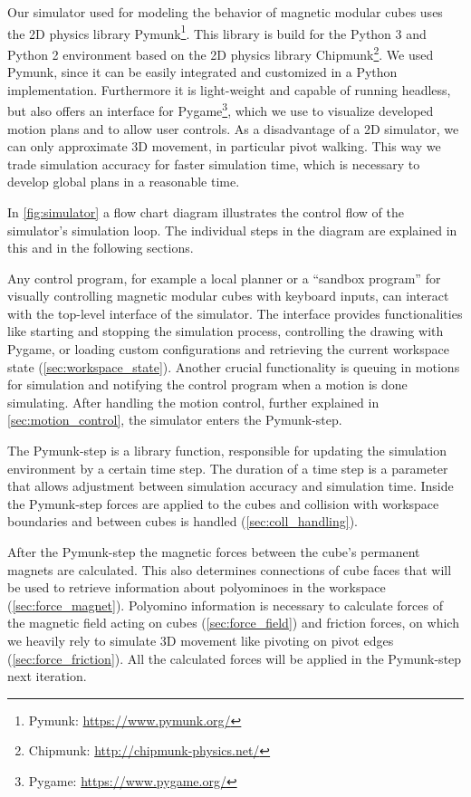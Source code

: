 Our simulator used for modeling the behavior of magnetic modular cubes uses the 2D physics library Pymunk\footnote{Pymunk: \url{https://www.pymunk.org/}}.
This library is build for the Python 3 and Python 2 environment based on the 2D physics library Chipmunk\footnote{Chipmunk: \url{http://chipmunk-physics.net/}}.
We used Pymunk, since it can be easily integrated and customized in a Python implementation.
Furthermore it is light-weight and capable of running headless, but also offers an interface for Pygame\footnote{Pygame: \url{https://www.pygame.org/}}, which we use to visualize developed motion plans and to allow user controls.
As a disadvantage of a 2D simulator, we can only approximate 3D movement, in particular pivot walking.
This way we trade simulation accuracy for faster simulation time, which is necessary to develop global plans in a reasonable time.

In \autoref{fig:simulator} a flow chart diagram illustrates the control flow of the simulator's simulation loop.
The individual steps in the diagram are explained in this and in the following sections.

Any control program, for example a local planner or a ``sandbox program'' for visually controlling magnetic modular cubes with keyboard inputs, can interact with the top-level interface of the simulator.
The interface provides functionalities like starting and stopping the simulation process, controlling the drawing with Pygame, or loading custom configurations and retrieving the current workspace state (\autoref{sec:workspace_state}).
Another crucial functionality is queuing in motions for simulation and notifying the control program when a motion is done simulating.
After handling the motion control, further explained in \autoref{sec:motion_control}, the simulator enters the Pymunk-step.

The Pymunk-step is a library function, responsible for updating the simulation environment by a certain time step.
The duration of a time step is a parameter that allows adjustment between simulation accuracy and simulation time. 
Inside the Pymunk-step forces are applied to the cubes and collision with workspace boundaries and between cubes is handled (\autoref{sec:coll_handling}).

After the Pymunk-step the magnetic forces between the cube's permanent magnets are calculated.
This also determines connections of cube faces that will be used to retrieve information about polyominoes in the workspace (\autoref{sec:force_magnet}).
Polyomino information is necessary to calculate forces of the magnetic field acting on cubes (\autoref{sec:force_field}) and friction forces, on which we heavily rely to simulate 3D movement like pivoting on pivot edges (\autoref{sec:force_friction}).
All the calculated forces will be applied in the Pymunk-step next iteration.

